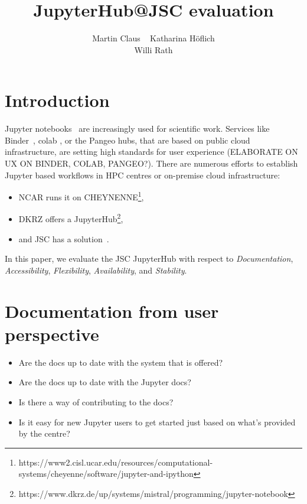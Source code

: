 \documentclass[11pt,a4paper]{article}
\title{\textbf{JupyterHub@JSC evaluation}}
\author{
  Martin Claus \ %
	Katharina Höflich \\
	Willi Rath}
\begin{document}
\maketitle


%


\section{Introduction}
\label{s-introductoin}

Jupyter notebooks~\citep{Kluyver2016} are increasingly used for scientific work.
Services like Binder~\citep{Jupyter2018}, colab \citep{Google2020, Carneiro2018}, or the Pangeo hubs\citep{robinson2019science}, that are based on public cloud infrastructure, are setting high standards for user experience (ELABORATE ON UX ON BINDER, COLAB, PANGEO?).
There are numerous efforts to establish Jupyter based workflows in HPC centres or on-premise cloud infrastructure:
\begin{itemize}
  \item NCAR runs it on CHEYNENNE\footnote{https://www2.cisl.ucar.edu/resources/computational-systems/cheyenne/software/jupyter-and-ipython},
  \item DKRZ offers a JupyterHub\footnote{https://www.dkrz.de/up/systems/mistral/programming/jupyter-notebook},
  \item and JSC has a solution~\citep{Goebbert2018}.
\end{itemize}

In this paper, we evaluate the JSC JupyterHub with respect to {\em Documentation}, {\em Accessibility}, {\em Flexibility}, {\em Availability}, and {\em Stability}.


\section{Documentation from user perspective}
\label{s-doc-from-user-pov}

\begin{itemize}
	\item Are the docs up to date with the system that is offered?
	\item Are the docs up to date with the Jupyter docs?
	\item Is there a way of contributing to the docs?
	\item Is it easy for new Jupyter users to get started just based on what's provided by the centre?
\end{itemize}
\end{document}
